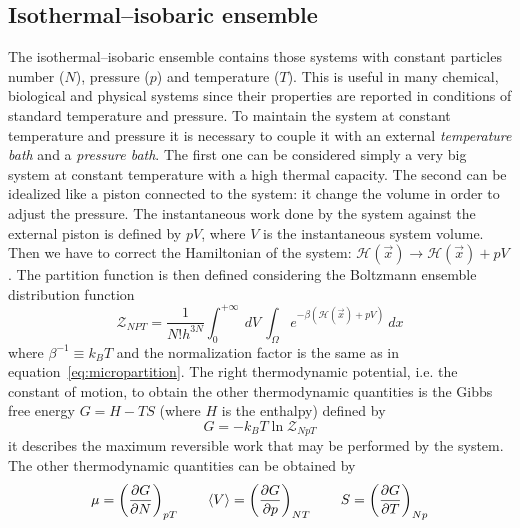 \subsection{Isothermal--isobaric ensemble}
The isothermal--isobaric ensemble contains those systems with constant particles number ($N$), pressure ($p$) and 
temperature ($T$). This is useful in many chemical, biological and physical systems since their properties are 
reported in conditions of standard temperature and pressure. To maintain the system at constant temperature and 
pressure it is necessary to couple it with an external \textit{temperature bath} and a \textit{pressure bath}. 
The first one can be considered simply a very big system at constant temperature with a high thermal capacity. 
The second can be idealized like a piston connected to the system: it change the volume in order to adjust the 
pressure. The instantaneous work done by the system against the external piston is defined by $pV$, where $V$ is 
the instantaneous system volume. Then we have to correct the Hamiltonian of the system: 
$\mathcal{H}(\vec x) \rightarrow \mathcal{H}(\vec x) + pV$. The partition function is then defined considering 
the Boltzmann ensemble distribution function
\begin{equation}
	\mathcal{Z}_{NPT} = \frac{1}{N!h^{3N}}\int_0^{+\infty}\ dV \ \int_\Omega e^{-\beta(\mathcal{H}(\vec x) + pV)}\ dx
	\label{eq:nptPartition}
\end{equation}
where $\beta^{-1} \equiv k_B T$ and the normalization factor is the same as in 
equation~\eqref{eq:micropartition}. The right thermodynamic potential, i.e. the constant of motion, to obtain the 
other thermodynamic quantities is the Gibbs free energy $G = H - TS$ (where $H$ is the enthalpy) defined by
\begin{equation*}
	G = -k_B T\ln \mathcal{Z}_{NpT}
\end{equation*}
it describes the maximum reversible work that may be performed by the system. The other thermodynamic quantities 
can be obtained by
\begin{equation*}
	\mu = \left ( \frac{\partial G}{\partial N}\right )_{pT} \qquad \left \langle V \right \rangle = \left ( \frac{\partial G}{\partial p}\right )_{NT} \qquad S = \left ( \frac{\partial G}{\partial T}\right )_{Np}
\end{equation*}

